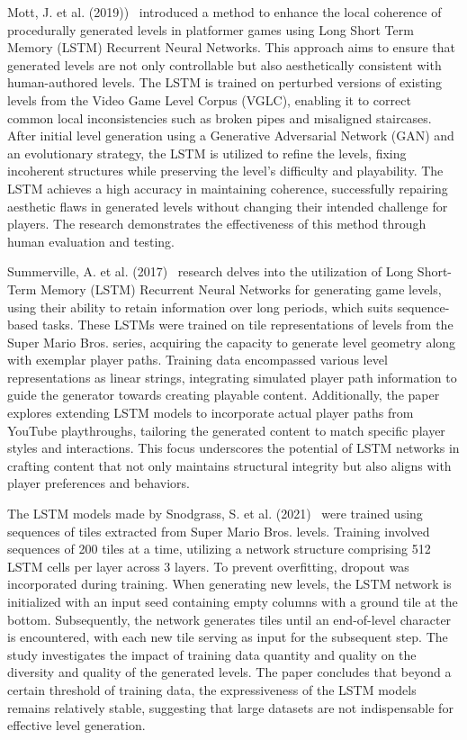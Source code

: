 \documentclass[runningheads]{llncs}
\begin{document}
Mott, J. et al. (2019))~\cite{ref_article2} introduced a method to enhance the local coherence of procedurally generated levels in platformer games using Long Short Term Memory (LSTM) Recurrent Neural Networks. This approach aims to ensure that generated levels are not only controllable but also aesthetically consistent with human-authored levels. The LSTM is trained on perturbed versions of existing levels from the Video Game Level Corpus (VGLC), enabling it to correct common local inconsistencies such as broken pipes and misaligned staircases. After initial level generation using a Generative Adversarial Network (GAN) and an evolutionary strategy, the LSTM is utilized to refine the levels, fixing incoherent structures while preserving the level's difficulty and playability. The LSTM achieves a high accuracy in maintaining coherence, successfully repairing aesthetic flaws in generated levels without changing their intended challenge for players. The research demonstrates the effectiveness of this method through human evaluation and testing.

Summerville, A. et al. (2017)~\cite{ref_article25} research delves into the utilization of Long Short-Term Memory (LSTM) Recurrent Neural Networks for generating game levels, using their ability to retain information over long periods, which suits sequence-based tasks. These LSTMs were trained on tile representations of levels from the Super Mario Bros. series, acquiring the capacity to generate level geometry along with exemplar player paths. Training data encompassed various level representations as linear strings, integrating simulated player path information to guide the generator towards creating playable content. Additionally, the paper explores extending LSTM models to incorporate actual player paths from YouTube playthroughs, tailoring the generated content to match specific player styles and interactions. This focus underscores the potential of LSTM networks in crafting content that not only maintains structural integrity but also aligns with player preferences and behaviors.

The LSTM models made by Snodgrass, S. et al. (2021)~\cite{ref_article18} were trained using sequences of tiles extracted from Super Mario Bros. levels. Training involved sequences of 200 tiles at a time, utilizing a network structure comprising 512 LSTM cells per layer across 3 layers. To prevent overfitting, dropout was incorporated during training. When generating new levels, the LSTM network is initialized with an input seed containing empty columns with a ground tile at the bottom. Subsequently, the network generates tiles until an end-of-level character is encountered, with each new tile serving as input for the subsequent step. The study investigates the impact of training data quantity and quality on the diversity and quality of the generated levels. The paper concludes that beyond a certain threshold of training data, the expressiveness of the LSTM models remains relatively stable, suggesting that large datasets are not indispensable for effective level generation.
\end{document}
